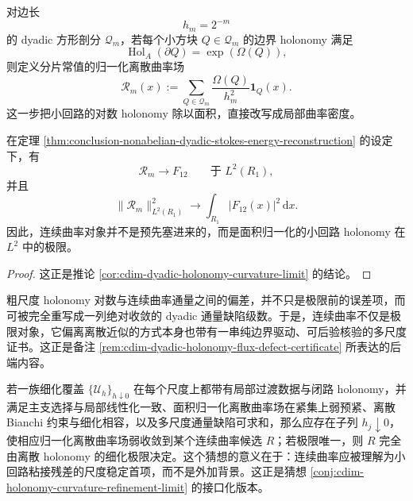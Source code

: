 \begin{definition}\label{def:typed-address-biaxial-completion-dyadic-holonomy-curvature}
对边长
\[
h_m=2^{-m}
\]
的 dyadic 方形剖分 \(\mathcal Q_m\)，若每个小方块 \(Q\in\mathcal Q_m\) 的边界 holonomy 满足
\[
\operatorname{Hol}_A(\partial Q)=\exp(\Omega(Q)),
\]
则定义分片常值的归一化离散曲率场
\[
\mathscr R_m(x):=\sum_{Q\in\mathcal Q_m}\frac{\Omega(Q)}{h_m^2}\mathbf 1_Q(x).
\]
这一步把小回路的对数 holonomy 除以面积，直接改写成局部曲率密度。
\end{definition}

\begin{corollary}[归一化曲率的连续极限]\label{cor:typed-address-biaxial-completion-dyadic-curvature-limit}
在定理 \ref{thm:conclusion-nonabelian-dyadic-stokes-energy-reconstruction} 的设定下，有
\[
\mathscr R_m\longrightarrow F_{12}
\qquad\text{于 }L^2(R_1),
\]
并且
\[
\|\mathscr R_m\|_{L^2(R_1)}^2
\longrightarrow
\int_{R_1}|F_{12}(x)|^2\,\mathrm d x.
\]
因此，连续曲率对象并不是预先塞进来的，而是面积归一化的小回路 holonomy 在 \(L^2\) 中的极限。
\end{corollary}
\begin{proof}
这正是推论 \ref{cor:cdim-dyadic-holonomy-curvature-limit} 的结论。
\end{proof}

\begin{remark}[通量缺陷给出的后验证书]\label{rem:typed-address-biaxial-completion-flux-defect-certificate}
粗尺度 holonomy 对数与连续曲率通量之间的偏差，并不只是极限前的误差项，而可被完全重写成一列绝对收敛的 dyadic 通量缺陷级数。于是，连续曲率不仅是极限对象，它偏离离散近似的方式本身也带有一串纯边界驱动、可后验核验的多尺度证书。这正是备注 \ref{rem:cdim-dyadic-holonomy-flux-defect-certificate} 所表达的后端内容。
\end{remark}

\begin{conjecture}\label{conj:typed-address-biaxial-completion-holonomy-curvature-limit}
若一族细化覆盖 \(\{\mathcal U_h\}_{h\downarrow 0}\) 在每个尺度上都带有局部过渡数据与闭路 holonomy，并满足主支选择与局部线性化一致、面积归一化离散曲率场在紧集上弱预紧、离散 Bianchi 约束与细化相容，以及多尺度通量缺陷可求和，那么应存在子列 \(h_j\downarrow 0\)，使相应归一化离散曲率场弱收敛到某个连续曲率候选 \(R\)；若极限唯一，则 \(R\) 完全由离散 holonomy 的细化极限决定。这个猜想的意义在于：连续曲率应被理解为小回路粘接残差的尺度稳定首项，而不是外加背景。这正是猜想 \ref{conj:cdim-holonomy-curvature-refinement-limit} 的接口化版本。
\end{conjecture}

